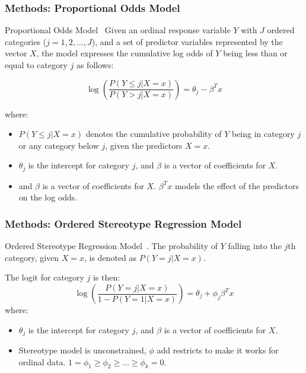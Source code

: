 \documentclass[xcolor=svgnames]{beamer}
\begin{document}
\begin{frame}\frametitle{Methods: Proportional Odds Model}

  Proportional Odds Model~\cite{mccullagh1980regression} Given an ordinal response variable $Y$ with $J$ ordered categories ($j=1, 2, \ldots, J$), 
  and a set of predictor variables represented by the vector $X$, the model expresses 
  the cumulative log odds of $Y$ being less than or equal to category $j$ as follows:
  
  \[
    \log\left(\frac{P(Y \leq j | X = x)}{P(Y > j | X = x)}\right) = \theta_j - \beta^T x
    \]

  where:
  {\small
    \begin{itemize}
        \item $P(Y \leq j | X = x)$ denotes the cumulative probability of $Y$ being in category $j$ or any category below $j$, given the predictors $X=x$.
        \item $\theta_j$ is the intercept for category $j$, and $\beta$ is a vector of coefficients for $X$.
        \item and $\beta$ is a vector of coefficients for $X$. $\beta^T x$ models the effect of the predictors on the log odds.
    \end{itemize}
  }
  
  
\end{frame}


\begin{frame}\frametitle{Methods: Ordered Stereotype Regression Model}

  Ordered Stereotype Regression Model~\cite{anderson1984regression}. 
  The probability of $Y$ falling into the $j$th category, given $X = x$, is denoted as $P(Y = j | X = x)$.

The logit for category $j$ is then:
\[
\log\left(\frac{P(Y = j | X = x)}{1 - P(Y = 1 | X = x)}\right) = \theta_j + \phi_j \beta^T x
\]
where:

{\small
    \begin{itemize}
        \item $\theta_j$ is the intercept for category $j$, and $\beta$ is a vector of coefficients for $X$.
        \item Stereotype model is unconstrained, $\phi$ add restricts to make it works for ordinal data. $1 = \phi_1 \geq \phi_2 \geq \ldots \geq \phi_k = 0.$ 
\end{itemize}
}

\end{frame}
\end{document}
